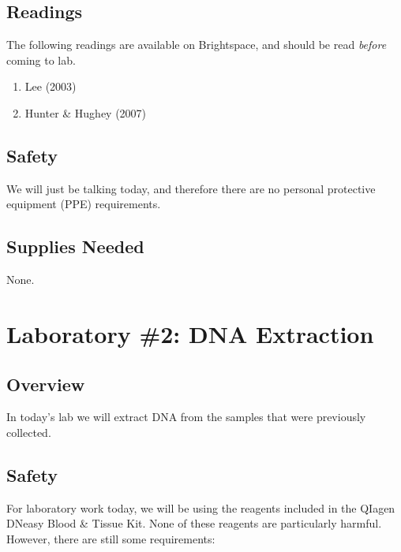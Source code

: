 \documentclass[12pt, hidelinks]{article}
\begin{document}
	
	\subsection{Readings}
	The following readings are available on Brightspace, and should be read \emph{before} coming to lab.
		\begin{enumerate}
			\item Lee (2003)
			\item Hunter \& Hughey (2007)
		\end{enumerate}
	
	
	\subsection{Safety}
	We will just be talking today, and therefore there are no personal protective equipment (PPE) requirements.
	
	
	\subsection{Supplies Needed}
	None.


\newpage
\section{Laboratory \#2: DNA Extraction}


	\subsection{Overview}
	In today's lab we will extract DNA from the samples that were previously collected.
	
	
	\subsection{Safety}
	For laboratory work today, we will be using the reagents included in the QIagen DNeasy Blood \& Tissue Kit. None of these reagents are particularly harmful. However, there are still some requirements:
	
\end{document}
